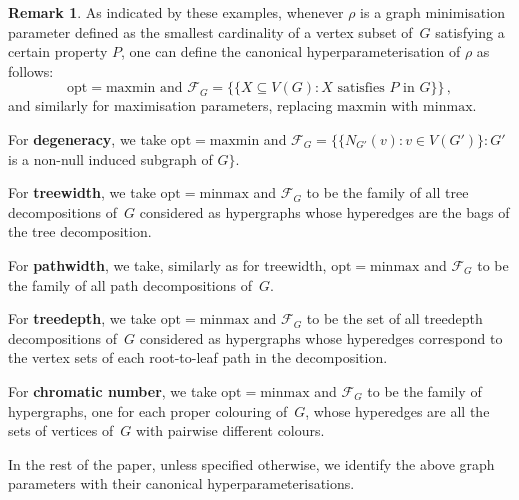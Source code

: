 \documentclass[11pt]{article}
\newcommand{\minmax}{\mathrm{minmax}}
\newcommand{\maxmin}{\mathrm{maxmin}}
\newcommand{\opt}{\mathrm{opt}}
\theoremstyle{plain}
\theoremstyle{definition}
\newtheorem{remark}[theorem]{Remark}
\theoremstyle{remark}
\numberwithin{equation}{section}
\begin{document}
\begin{remark}\label{hyperpar-optimisation}
As indicated by these examples, whenever $\rho$ is a graph minimisation parameter defined as the smallest cardinality of a vertex subset of~$G$ satisfying a certain property $P$, one can define the canonical hyperparameterisation of $\rho$ as follows:
\[
    \opt = \maxmin \text{ and } \mathcal{F}_G = \big\{\{X\subseteq V(G) \colon X \text{ satisfies $P$ in $G$}\}\big\}\,,\]
and similarly for maximisation parameters, replacing $\maxmin$ with $\minmax$.
\end{remark}

\medskip
\noindent For \textbf{degeneracy}, we take $\opt = \maxmin$ and $\mathcal{F}_G = \{\{ N_{G'}(v) \colon v \in V(G')\}\colon  G'$ is a non-null induced subgraph of $G\}$.

\medskip
\noindent For \textbf{treewidth},\label{treewidth-hyperparameterisation}
 we take $\opt = \minmax$ and $\mathcal{F}_G$ to be the family of all tree decompositions of~$G$ considered as hypergraphs whose hyperedges are the bags of the tree decomposition.

\medskip
\noindent For \textbf{pathwidth}, we take, similarly as for treewidth, $\opt = \minmax$ and $\mathcal{F}_G$ to be the family of all path decompositions of~$G$.

\medskip
\noindent For \textbf{treedepth}, we take $\opt = \minmax$ and $\mathcal{F}_G$ to be the set of all treedepth decompositions of~$G$ considered as hypergraphs whose hyperedges correspond to the vertex sets of each root-to-leaf path in the decomposition.

\medskip
\noindent 
For \textbf{chromatic number}, we take $\opt = \minmax$ and $\mathcal{F}_G$ to be the family of hypergraphs, one for each proper colouring of~$G$, whose hyperedges are all the sets of vertices of~$G$ with pairwise different colours.

\medskip
In the rest of the paper, unless specified otherwise, we identify the above graph parameters with their canonical hyperparameterisations.
\end{document}
